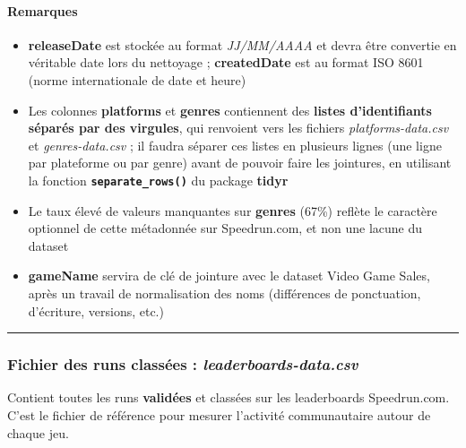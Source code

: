 \documentclass[
]{article}
\providecommand{\tightlist}{%
  \setlength{\itemsep}{0pt}\setlength{\parskip}{0pt}}
\begin{document}
\paragraph{Remarques}\label{remarques-1}

\begin{itemize}
\tightlist
\item
  \textbf{releaseDate} est stockée au format \emph{JJ/MM/AAAA} et devra
  être convertie en véritable date lors du nettoyage ;
  \textbf{createdDate} est au format ISO 8601 (norme internationale de
  date et heure)
\item
  Les colonnes \textbf{platforms} et \textbf{genres} contiennent des
  \textbf{listes d'identifiants séparés par des virgules}, qui renvoient
  vers les fichiers \emph{platforms-data.csv} et \emph{genres-data.csv}
  ; il faudra séparer ces listes en plusieurs lignes (une ligne par
  plateforme ou par genre) avant de pouvoir faire les jointures, en
  utilisant la fonction \textbf{\texttt{separate\_rows()}} du package
  \textbf{tidyr}
\item
  Le taux élevé de valeurs manquantes sur \textbf{genres} (67\%) reflète
  le caractère optionnel de cette métadonnée sur Speedrun.com, et non
  une lacune du dataset
\item
  \textbf{gameName} servira de clé de jointure avec le dataset Video
  Game Sales, après un travail de normalisation des noms (différences de
  ponctuation, d'écriture, versions, etc.)
\end{itemize}

\begin{center}\rule{0.5\linewidth}{0.5pt}\end{center}

\subsubsection{\texorpdfstring{Fichier des runs classées :
\emph{leaderboards-data.csv}}{Fichier des runs classées : leaderboards-data.csv}}\label{fichier-des-runs-classuxe9es-leaderboards-data.csv}

Contient toutes les runs \textbf{validées} et classées sur les
leaderboards Speedrun.com. C'est le fichier de référence pour mesurer
l'activité communautaire autour de chaque jeu.
\end{document}
